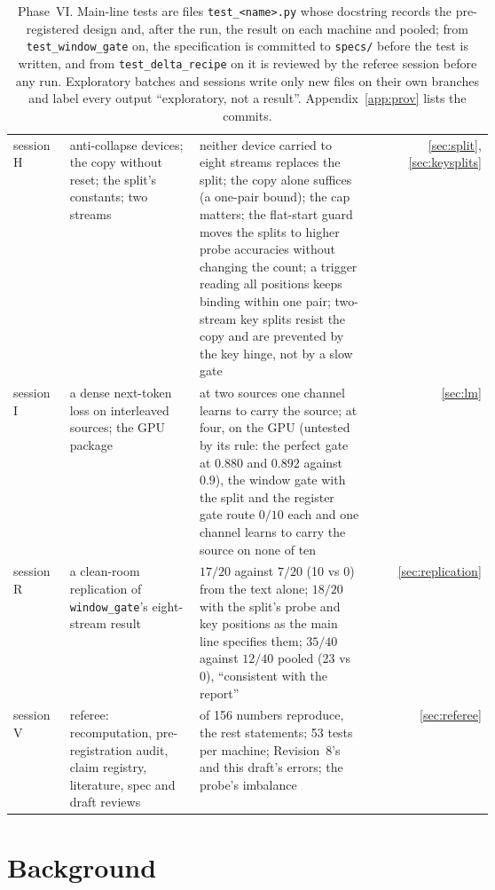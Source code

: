 \documentclass[11pt]{article}
\begin{document}
\begin{table}[H]
\begin{tabular}{@{}l>{\raggedright\arraybackslash}p{0.27\linewidth}>{\raggedright\arraybackslash}p{0.36\linewidth}r@{}}
session H & anti-collapse devices; the copy without reset; the split's constants; two streams & neither device carried to eight streams replaces the split; the copy alone suffices (a one-pair bound); the cap matters; the flat-start guard moves the splits to higher probe accuracies without changing the count; a trigger reading all positions keeps binding within one pair; two-stream key splits resist the copy and are prevented by the key hinge, not by a slow gate & \ref{sec:split}, \ref{sec:keysplits}\\
session I & a dense next-token loss on interleaved sources; the GPU package & at two sources one channel learns to carry the source; at four, on the GPU (untested by its rule: the perfect gate at $0.880$ and $0.892$ against $0.9$), the window gate with the split and the register gate route $0/10$ each and one channel learns to carry the source on none of ten & \ref{sec:lm}\\
session R & a clean-room replication of \texttt{window\_gate}'s eight-stream result & $17/20$ against $7/20$ (10 vs 0) from the text alone; $18/20$ with the split's probe and key positions as the main line specifies them; $35/40$ against $12/40$ pooled (23 vs 0), ``consistent with the report'' & \ref{sec:replication}\\
session V & referee: recomputation, pre-registration audit, claim registry, literature, spec and draft reviews & 140 of 156 numbers reproduce, the rest statements; 53 tests per machine; Revision~8's and this draft's errors; the probe's imbalance & \ref{sec:referee}\\
\bottomrule
\end{tabular}
\caption{Phase~VI. Main-line tests are files \texttt{test\_<name>.py} whose docstring records the pre-registered design and, after the run, the result on each machine and pooled; from \texttt{test\_window\_gate} on, the specification is committed to \texttt{specs/} before the test is written, and from \texttt{test\_delta\_recipe} on it is reviewed by the referee session before any run. Exploratory batches and sessions write only new files on their own branches and label every output ``exploratory, not a result''. Appendix~\ref{app:prov} lists the commits.}
\label{tab:index}
\end{table}

\section{Background}
\label{sec:background}
\end{document}
